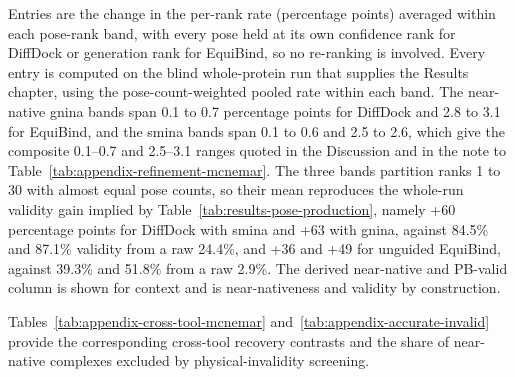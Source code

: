 \begin{landscape}
\begin{longtable}[]
{Entries are the change in the per-rank rate (percentage points) averaged within each pose-rank band, with every pose held at its own confidence rank for DiffDock or generation rank for EquiBind, so no re-ranking is involved. Every entry is computed on the blind whole-protein run that supplies the Results chapter, using the pose-count-weighted pooled rate within each band. The near-native gnina bands span 0.1 to 0.7 percentage points for DiffDock and 2.8 to 3.1 for EquiBind, and the smina bands span 0.1 to 0.6 and 2.5 to 2.6, which give the composite 0.1--0.7 and 2.5--3.1 ranges quoted in the Discussion and in the note to Table~\ref{tab:appendix-refinement-mcnemar}. The three bands partition ranks 1 to 30 with almost equal pose counts, so their mean reproduces the whole-run validity gain implied by Table~\ref{tab:results-pose-production}, namely +60 percentage points for DiffDock with smina and +63 with gnina, against 84.5\% and 87.1\% validity from a raw 24.4\%, and +36 and +49 for unguided EquiBind, against 39.3\% and 51.8\% from a raw 2.9\%. The derived near-native and PB-valid column is shown for context and is near-nativeness and validity by construction.} \\
\end{longtable}
\end{landscape}

Tables~\ref{tab:appendix-cross-tool-mcnemar} and~\ref{tab:appendix-accurate-invalid} provide the corresponding cross-tool recovery contrasts and the share of near-native complexes excluded by physical-invalidity screening.

